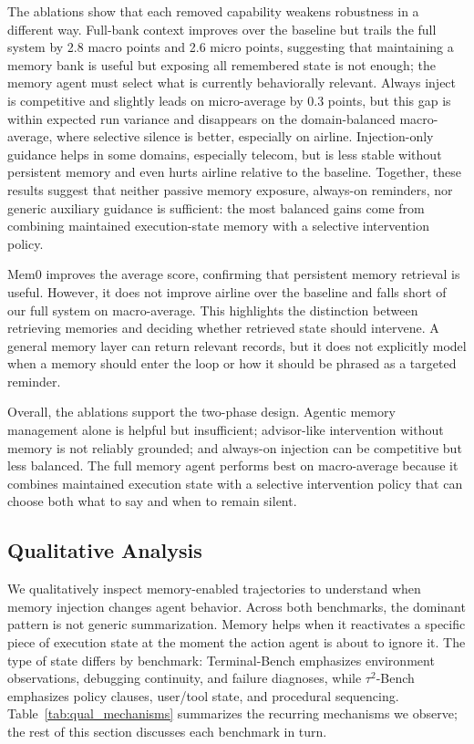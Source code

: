 The ablations show that each removed capability weakens robustness in a
different way. Full-bank context improves over the baseline but trails the full
system by 2.8 macro points and 2.6 micro points, suggesting that maintaining a
memory bank is useful but exposing all remembered state is not enough; the memory
agent must select what is currently behaviorally relevant. Always inject is
competitive and slightly leads on micro-average by 0.3 points, but this gap is
within expected run variance and disappears on the domain-balanced macro-average,
where selective silence is better, especially on airline. Injection-only guidance helps in some domains, especially
telecom, but is less stable without persistent memory and even hurts airline
relative to the baseline. Together, these results suggest that neither passive
memory exposure, always-on reminders, nor generic auxiliary guidance is
sufficient: the most balanced gains come from combining maintained execution-state
memory with a selective intervention policy.

Mem0 improves the average score, confirming that persistent
memory retrieval is useful. However, it does not improve airline over the
baseline and falls short of our full system on macro-average. This highlights
the distinction between retrieving memories and deciding whether retrieved state
should intervene. A general memory layer can return relevant records, but it
does not explicitly model when a memory should enter the loop or how it
should be phrased as a targeted reminder.

Overall, the ablations support the two-phase design. Agentic memory management
alone is helpful but insufficient; advisor-like intervention without memory is
not reliably grounded; and always-on injection can be competitive but less
balanced. The full memory agent performs best on macro-average because it
combines maintained execution state with a selective intervention policy that can
choose both what to say and when to remain silent.


\subsection{Qualitative Analysis}

We qualitatively inspect memory-enabled trajectories to understand when memory
injection changes agent behavior. Across both benchmarks, the dominant pattern
is not generic summarization. Memory helps when it reactivates a specific piece
of execution state at the moment the action agent is about to ignore it. The
type of state differs by benchmark: Terminal-Bench emphasizes environment
observations, debugging continuity, and failure diagnoses, while $\tau^2$-Bench
emphasizes policy clauses, user/tool state, and procedural sequencing.
Table~\ref{tab:qual_mechanisms} summarizes the recurring mechanisms we observe;
the rest of this section discusses each benchmark in turn.

